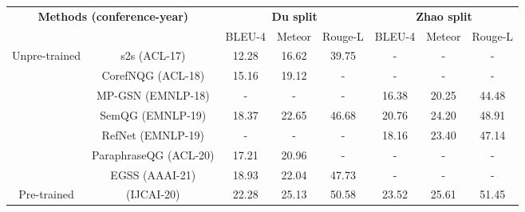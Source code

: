 \documentclass[11pt]{article}
\begin{document}
\begin{table*}[t]
\centering
\small
\begin{tabular}{@{}c|c|ccc|ccc@{}}
\toprule[1pt]
\multicolumn{2}{c|}{\multirow{2}{*}{\textbf{Methods (conference-year)}}} & \multicolumn{3}{c|}{\textbf{Du split}}    & \multicolumn{3}{c}{\textbf{Zhao split}}                            \\
\multicolumn{2}{c|}{}                     & BLEU-4         & Meteor         & Rouge-L & BLEU-4               & Meteor               & Rouge-L              \\ \midrule
\multirow{7}{*}{Unpre-trained}           & s2s (ACL-17)                    & 12.28          & 16.62          & 39.75       & -                    & -                    & -                    \\  
& CorefNQG (ACL-18)                    & 15.16          & 19.12          & -       & -                    & -                    & -                    \\
 & MP-GSN (EMNLP-18)                      & -              & -              & -       & 16.38                & 20.25                & 44.48     
 \\


                                          & SemQG (EMNLP-19)                       & 18.37          & 22.65          & 46.68   & 20.76                & 24.20                & 48.91                \\
                                          & RefNet (EMNLP-19)                      & -              & -              & -       & 18.16                & 23.40                & 47.14                \\
 & ParaphraseQG (ACL-20)                      & 17.21              & 20.96              & -       & -                & -                & -                \\
                                         
                                          & EGSS (AAAI-21)                        & 18.93          & 22.04          & 47.73   & -                    & -                    & -     
                                          \\ \midrule
\multirow{5}{*}{Pre-trained}               


 &  (IJCAI-20)            & 22.28          & 25.13          & 50.58   & 23.52                & 25.61                & 51.45                \\


\end{tabular}
\end{table*}
\end{document}
